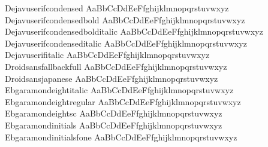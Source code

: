 \begin{tabbing}
Dejavuserifcondensed \> { AaBbCcDdEeFfghijklmnopqrstuvwxyz} \\
Dejavuserifcondensedbold \> { AaBbCcDdEeFfghijklmnopqrstuvwxyz} \\
Dejavuserifcondensedbolditalic \> { AaBbCcDdEeFfghijklmnopqrstuvwxyz} \\
Dejavuserifcondenseditalic \> { AaBbCcDdEeFfghijklmnopqrstuvwxyz} \\
Dejavuserifitalic \> { AaBbCcDdEeFfghijklmnopqrstuvwxyz} \\
Droidsansfallbackfull \> { AaBbCcDdEeFfghijklmnopqrstuvwxyz} \\
Droidsansjapanese \> { AaBbCcDdEeFfghijklmnopqrstuvwxyz} \\
Ebgaramondeightitalic \> { AaBbCcDdEeFfghijklmnopqrstuvwxyz} \\
Ebgaramondeightregular \> { AaBbCcDdEeFfghijklmnopqrstuvwxyz} \\
Ebgaramondeightsc \> { AaBbCcDdEeFfghijklmnopqrstuvwxyz} \\
Ebgaramondinitials \> { AaBbCcDdEeFfghijklmnopqrstuvwxyz} \\
Ebgaramondinitialsfone \> { AaBbCcDdEeFfghijklmnopqrstuvwxyz} \\

\end{tabbing}
